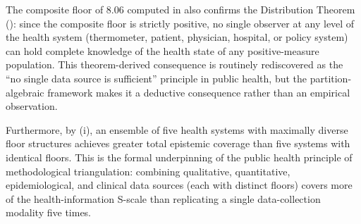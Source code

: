 \begin{remark}
\label{rem:ch02-floor-distribution-link}
The composite floor of $8.06$ computed in 
also confirms the Distribution Theorem (): since
the composite floor is strictly positive, no single observer at any level of
the health system (thermometer, patient, physician, hospital, or policy system)
can hold complete knowledge of the health state of any positive-measure
population.  This theorem-derived consequence is routinely rediscovered as the
``no single data source is sufficient'' principle in public health, but the
partition-algebraic framework makes it a deductive consequence rather than an
empirical observation.

Furthermore, by (i), an ensemble of five
health systems with maximally diverse floor structures achieves greater total
epistemic coverage than five systems with identical floors.  This is the formal
underpinning of the public health principle of methodological triangulation:
combining qualitative, quantitative, epidemiological, and clinical data sources
(each with distinct floors) covers more of the health-information S-scale than
replicating a single data-collection modality five times.
\end{remark}

